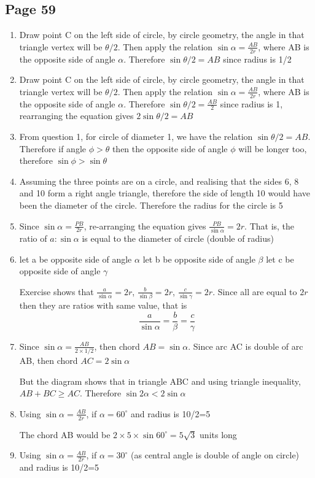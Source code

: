 \documentclass{article}
\newenvironment{solutions}[1]
{\subsection*{#1}
 \begin{enumerate}[leftmargin=1.5em]}
{\end{enumerate}}
\newcommand{\solution}{\item}
\begin{document}
\begin{solutions}{Page 59}
\solution
Draw point C on the left side of circle, by circle geometry, the angle in that triangle vertex will be $\theta/2$. Then apply the relation $\sin \alpha = \frac{AB}{2r}$, where AB is the opposite side of angle $\alpha$. Therefore $\sin \theta/2 = AB$ since radius is 1/2
 
\solution
Draw point C on the left side of circle, by circle geometry, the angle in that triangle vertex will be $\theta/2$. Then apply the relation $\sin \alpha = \frac{AB}{2r}$, where AB is the opposite side of angle $\alpha$. Therefore $\sin \theta/2 = \frac{AB}{2}$ since radius is 1, rearranging the equation gives $2\sin \theta/2 = AB$

\solution
From question 1, for circle of diameter 1, we have the relation $\sin \theta/2 = AB$. Therefore if angle $\phi > \theta$ then the opposite side of angle $\phi$ will be longer too, therefore $\sin \phi > \sin \theta$
\solution
Assuming the three points are on a circle, and realising that the sides 6, 8 and 10 form a right angle triangle, therefore the side of length 10 would have been the diameter of the circle. Therefore the radius for the circle is 5
\solution
Since $\sin \alpha = \frac{PB}{2r}$, re-arranging the equation gives $\frac{PB}{\sin \alpha } = 2r$. That is, the ratio of $a:\sin \alpha$ is equal to the diameter of circle (double of radius)
\solution
let a be opposite side of angle $\alpha$
let b be opposite side of angle $\beta$
let c be opposite side of angle $\gamma$

Exercise shows that $\frac{a}{\sin \alpha} = 2r$, $\frac{b}{\sin \beta} = 2r$, $\frac{c}{\sin \gamma} = 2r$. Since all are equal to $2r$ then they are ratios with same value, that is
\[\frac{a}{\sin \alpha} = \frac{b}{\beta} = \frac{c}{\gamma} \]

\solution
Since $\sin \alpha = \frac{AB}{2\times 1/2}$, then chord $AB=\sin \alpha$. Since arc AC is double of arc AB, then chord $AC = 2\sin \alpha$ 

But the diagram shows that in triangle ABC and using triangle inequality, $AB+BC \geq AC$. Therefore $\sin 2\alpha < 2\sin \alpha$

\solution
Using $\sin \alpha = \frac{AB}{2r}$, if $\alpha = 60^{\circ}$ and radius is 10/2=5

The chord AB would be $2\times 5 \times \sin 60^{\circ} = 5\sqrt{3}$ units long
\solution
Using $\sin \alpha = \frac{AB}{2r}$, if $\alpha = 30^{\circ}$ (as central angle is double of angle on circle) and radius is 10/2=5


\end{solutions}
\end{document}
